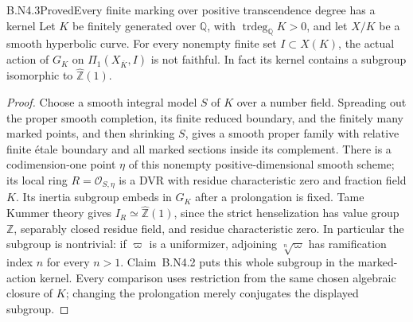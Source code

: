 \begin{claim}{B.N4.3}{Proved}{Every finite marking over positive transcendence degree has a kernel}
Let $K$ be finitely generated over $\mathbb Q$, with
$\operatorname{trdeg}_{\mathbb Q}K>0$, and let $X/K$ be a smooth
hyperbolic curve.  For every nonempty finite set $I\subset X(K)$, the
actual action of $G_K$ on $\widehat\Pi_1(X_{\overline K},I)$ is not
faithful.  In fact its kernel contains a subgroup isomorphic to
$\widehat{\mathbb Z}(1)$.
\end{claim}
\begin{proof}
Choose a smooth integral model $S$ of $K$ over a number field.  Spreading
out the proper smooth completion, its finite reduced boundary, and the
finitely many marked points, and then shrinking $S$, gives a smooth
proper family with relative finite \'etale boundary and all marked
sections inside its complement.  There is a codimension-one point
$\eta$ of this nonempty positive-dimensional smooth scheme; its local
ring $R=\mathcal O_{S,\eta}$ is a DVR with residue characteristic zero
and fraction field $K$.  Its inertia subgroup embeds in $G_K$ after a
prolongation is fixed.  Tame Kummer theory gives
$I_R\simeq\widehat{\mathbb Z}(1)$, since the strict henselization has
value group $\mathbb Z$, separably closed residue field, and residue
characteristic zero.  In particular the subgroup is nontrivial: if
$\varpi$ is a uniformizer, adjoining $\sqrt[n]{\varpi}$ has ramification
index $n$ for every $n>1$.  Claim~B.N4.2 puts this whole subgroup in the
marked-action kernel.  Every comparison uses restriction from the same
chosen algebraic closure of $K$; changing the prolongation merely
conjugates the displayed subgroup.
\end{proof}

